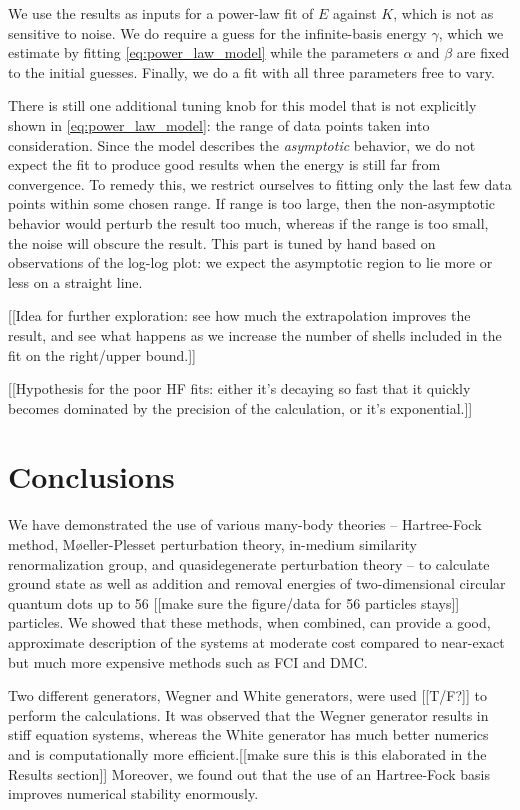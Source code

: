 We use the results as inputs for a power-law fit of $E$ against $K$, which is not as sensitive to noise.  We do require a guess for the infinite-basis energy $\gamma$, which we estimate by fitting \eqref{eq:power_law_model} while the parameters $\alpha$ and $\beta$ are fixed to the initial guesses.  Finally, we do a fit with all three parameters free to vary.

There is still one additional tuning knob for this model that is not explicitly shown in \eqref{eq:power_law_model}: the range of data points taken into consideration.  Since the model describes the \emph{asymptotic} behavior, we do not expect the fit to produce good results when the energy is still far from convergence.  To remedy this, we restrict ourselves to fitting only the last few data points within some chosen range.  If range is too large, then the non-asymptotic behavior would perturb the result too much, whereas if the range is too small, the noise will obscure the result.  This part is tuned by hand based on observations of the log-log plot: we expect the asymptotic region to lie more or less on a straight line.

[[Idea for further exploration: see how much the extrapolation improves the result, and see what happens as we increase the number of shells included in the fit on the right/upper bound.]]

[[Hypothesis for the poor HF fits: either it's decaying so fast that it quickly becomes dominated by the precision of the calculation, or it's exponential.]]

\section{Conclusions}
\label{sec:conclusions}

We have demonstrated the use of various many-body theories -- Hartree-Fock method, M\o eller-Plesset perturbation theory, in-medium similarity renormalization group, and quasidegenerate perturbation theory -- to calculate ground state as well as addition and removal energies of two-dimensional circular quantum dots up to 56 [[make sure the figure/data for 56 particles stays]] particles.  We showed that these methods, when combined, can provide a good, approximate description of the systems at moderate cost compared to near-exact but much more expensive methods such as FCI and DMC.

Two different generators, Wegner and White generators, were used [[T/F?]] to perform the calculations.  It was observed that the Wegner generator results in stiff equation systems, whereas the White generator has much better numerics and is computationally more efficient.[[make sure this is this elaborated in the Results section]] Moreover, we found out that the use of an Hartree-Fock basis improves numerical stability enormously.


